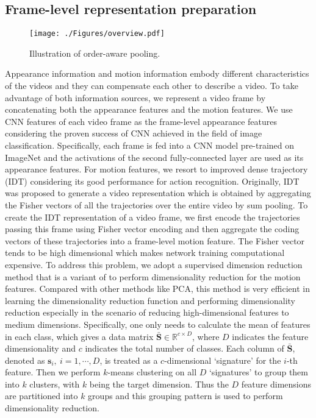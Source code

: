 \documentclass[journal]{IEEEtran}
\begin{document}
\subsection{Frame-level representation preparation}
\label{Frame-level representations}

\begin{figure*}[ht]
\begin{center}
\texttt{[image: ./Figures/overview.pdf]}
\end{center}
   \caption{Illustration of order-aware pooling.}
\label{fig:network}
\end{figure*}

Appearance information and motion information embody different characteristics of the videos and they can compensate each other to describe a video. To take advantage of both information sources, we represent a video frame by concatenating both the appearance features and the motion features. We use CNN features of each video frame as the frame-level appearance features considering the proven success of CNN achieved in the field of image classification. Specifically, each frame is fed into a CNN model \cite{NIPS2012_4824} pre-trained on ImageNet \cite{imagenet_cvpr09} and the activations of the second fully-connected layer are used as its appearance features. For motion features, we resort to improved dense trajectory (IDT) \cite{Wang2013} considering its good performance for action recognition. Originally, IDT was proposed to generate a video representation which is obtained by aggregating the Fisher vectors of all the trajectories over the entire video by sum pooling. To create the IDT representation of a video frame, we first encode the trajectories passing this frame using Fisher vector encoding and then aggregate the coding vectors of these trajectories into a frame-level motion feature. The Fisher vector tends to be high dimensional which makes network training computational expensive. To address this problem, we adopt a supervised dimension reduction method \cite{DBLP:journals/corr/WangCSLS15} that is a variant of \cite{Liu:2013} to perform dimensionality reduction for the motion features. Compared with other methods like PCA, this method is very efficient in learning the dimensionality reduction function and performing dimensionality reduction especially in the scenario of reducing high-dimensional features to medium dimensions. Specifically, one only needs to calculate the mean of features in each class, which gives a data matrix $\mathbf{\bar S} \in \mathbb{R}^{c\times D}$, where $D$ indicates the feature dimensionality and $c$ indicates the total number of classes. Each column of $\mathbf{\bar S}$, denoted as $\mathbf{s}_i,~i= 1,\cdots,D$, is treated as a $c$-dimensional `signature' for the $i$-th feature. Then we perform $k$-means clustering on all $D$ `signatures' to group them into $k$ clusters, with $k$ being the target dimension. Thus the $D$ feature dimensions are partitioned into $k$ groups and this grouping pattern is used to perform dimensionality reduction.
\end{document}
